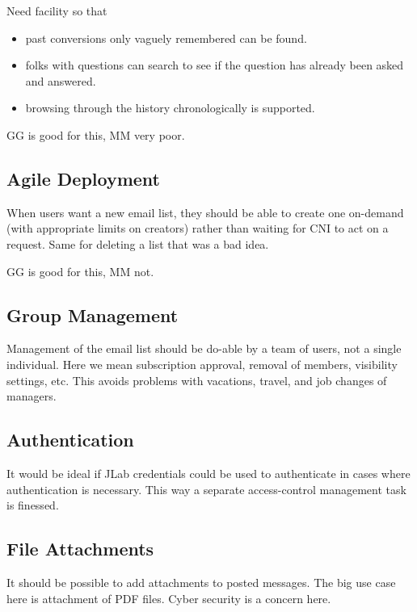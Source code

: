 \documentclass{article}
\begin{document}
Need facility so that

\begin{itemize}
  
\item past conversions only vaguely remembered can be found.

\item folks with questions can search to see if the question has
  already been asked and answered.

\item browsing through the history chronologically is supported.

\end{itemize}

GG is good for this, MM very poor.

\subsection{Agile Deployment}

When users want a new email list, they should be able to create one
on-demand (with appropriate limits on creators) rather than waiting
for CNI to act on a request. Same for deleting a list that was a bad
idea.

GG is good for this, MM not.

\subsection{Group Management}

Management of the email list should be do-able by a team of users, not
a single individual. Here we mean subscription approval, removal of
members, visibility settings, etc. This avoids problems with
vacations, travel, and job changes of managers.

\subsection{Authentication}

It would be ideal if JLab credentials could be used to authenticate in
cases where authentication is necessary. This way a separate
access-control management task is finessed.

\subsection{File Attachments}

It should be possible to add attachments to posted messages. The big
use case here is attachment of PDF files. Cyber security is a concern
here.
\end{document}
